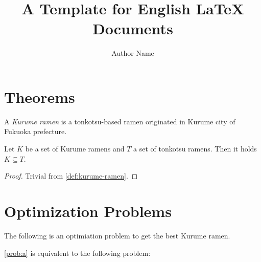 \documentclass[a4paper, 11pt]{article}
\title{A Template for English LaTeX Documents}
\author{Author Name}
\begin{document}
\maketitle


\section{Theorems}

\begin{definition} \label{def:kurume-ramen}
  A \emph{Kurume ramen} is a tonkotsu-based ramen originated in Kurume city of Fukuoka prefecture.
\end{definition}

\begin{theorem} \label{thm:pi}
  Let $K$ be a set of Kurume ramens and $T$ a set of tonkotsu ramens.
  Then it holds $K \subseteq T$.
\end{theorem}

\begin{proof}
  Trivial from \cref{def:kurume-ramen}.
\end{proof}


\section{Optimization Problems}

The following is an optimiation problem to get the best Kurume ramen.

%
\eqref{prob:a} is equivalent to the following problem:







\end{document}
